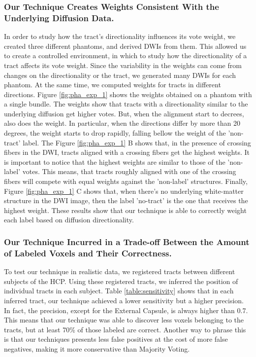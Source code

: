 \subsubsection{Our Technique Creates Weights Consistent With the Underlying
               Diffusion Data.}
In order to study how the tract's directionality influences its vote weight,
we created three different phantoms, and derived DWIs from them. This allowed us to
create a controlled environment, in which to study how the directionality
of a tract affects its vote weight. Since the variability in the weights can
come from changes on the directionality or the tract, we generated many DWIs
for each phantom. At the same time, we computed weights for tracts in different
directions. Figure \ref{fig:pha_exp_1} shows the weights obtained on a phantom
with a single bundle. The weights show that tracts with a directionality
similar to the underlying diffusion get higher votes. But, when the alignment
start to decrees, also does the weight. In particular, when the directions
differ by more than 20 degrees, the weight starts to drop rapidly, falling bellow the weight of the
'non-tract' label.
The Figure \ref{fig:pha_exp_1} B shows that, in the presence of crossing fibers
in the DWI, tracts aligned with a crossing fibers get the highest weights.
It is important to notice that the highest weights are similar to those of the
'non-label' votes. This means, that tracts roughly aligned with one of the
crossing fibers will compete with equal weights against the 'non-label' structures.
Finally, Figure \ref{fig:pha_exp_1} C shows that, when there's no underlying
white-matter structure in the DWI image,
then the label 'no-tract' is the one that receives the highest weight. These
results show that our technique is able to correctly weight each label based
on diffusion directionality.

\subsubsection{Our Technique Incurred in a Trade-off Between the Amount of
               Labeled Voxels and Their Correctness.}
To test our technique in realistic data, we registered tracts between different
subjects of the HCP. Using these registered tracts, we inferred the position
of individual tracts in each subject. Table \ref{table:sensitivity} shows that
in each inferred tract, our technique achieved a lower sensitivity but a higher
precision. In fact, the precision, except for the External Capsule, is always
higher than 0.7. This means that our technique was able to discover less voxels
belonging to the tracts, but at least 70\% of those labeled are correct. Another
way to phrase this is that our techniques presents less false positives at the
cost of more false negatives, making it more conservative than Majority Voting.

